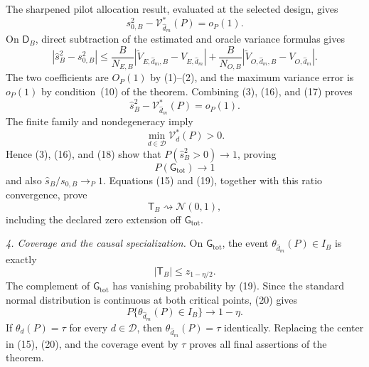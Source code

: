 The sharpened pilot allocation result, evaluated at the selected design, gives
\[
 s_{0,B}^2-\mathcal V_{\widehat d_m}^*(P)=o_P(1).
 \tag{16}
\]
On \(\mathsf D_B\), direct subtraction of the estimated and oracle variance formulas gives
\[
 |\widehat s_B^2-s_{0,B}^2|
 \le \frac{B}{N_{E,B}}
 |\widetilde V_{E,\widehat d_m,B}-V_{E,\widehat d_m}|
 +\frac{B}{N_{O,B}}
 |\widetilde V_{O,\widehat d_m,B}-V_{O,\widehat d_m}|.
 \tag{17}
\]
The two coefficients are \(O_P(1)\) by (1)--(2), and the maximum variance error is \(o_P(1)\) by condition~(10) of the theorem.  Combining (3), (16), and (17) proves
\[
 \widehat s_B^2-\mathcal V_{\widehat d_m}^*(P)=o_P(1).
 \tag{18}
\]
The finite family and nondegeneracy imply
\[
 \min_{d\in\mathcal D}\mathcal V_d^*(P)>0.
\]
Hence (3), (16), and (18) show that \(P(\widehat s_B^2>0)\to1\), proving
\[
 P(\mathsf G_{\mathrm{tot}})\longrightarrow1
 \tag{19}
\]
and also \(\widehat s_B/s_{0,B}\to_P1\).  Equations (15) and (19), together with this ratio convergence, prove
\[
 \mathsf T_B\rightsquigarrow\mathcal N(0,1),
 \tag{20}
\]
including the declared zero extension off \(\mathsf G_{\mathrm{tot}}\).

\emph{4. Coverage and the causal specialization.}
On \(\mathsf G_{\mathrm{tot}}\), the event \(\theta_{\widehat d_m}(P)\in I_B\) is exactly
\[
 |\mathsf T_B|\le z_{1-\eta/2}.
\]
The complement of \(\mathsf G_{\mathrm{tot}}\) has vanishing probability by (19).  Since the standard normal distribution is continuous at both critical points, (20) gives
\[
 P\{\theta_{\widehat d_m}(P)\in I_B\}\longrightarrow1-\eta.
\]
If \(\theta_d(P)=\tau\) for every \(d\in\mathcal D\), then \(\theta_{\widehat d_m}(P)=\tau\) identically.  Replacing the center in (15), (20), and the coverage event by \(\tau\) proves all final assertions of the theorem.